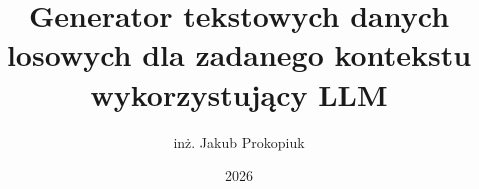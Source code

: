 \documentclass[thesis=mgr,faculty=ee]{EE-dyplom}
\title{Generator tekstowych danych losowych dla zadanego kontekstu wykorzystujący LLM}
\author{inż. Jakub Prokopiuk}
\date{2026}
\begin{document}
\frontpages



\bibliografia


\acronymslist
\listoffigures
\listoftables
\easyappendices
\end{document}
